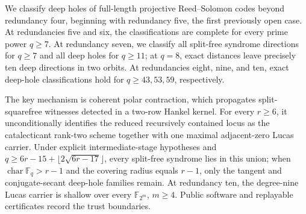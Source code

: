 We classify deep holes of full-length projective Reed--Solomon codes beyond
redundancy four, beginning with redundancy five, the first previously open
case. At redundancies five and six, the classifications are complete for every
prime power \(q\geq7\). At redundancy seven, we classify all split-free syndrome
directions for \(q\geq7\) and all deep holes for \(q\geq11\); at \(q=8\), exact
distances leave precisely ten deep directions in two orbits. At redundancies
eight, nine, and ten, exact deep-hole classifications hold for
\(q\geq43,53,59\), respectively.

The key mechanism is coherent polar contraction, which propagates
split-squarefree witnesses detected in a two-row Hankel kernel. For every
\(r\geq6\), it unconditionally identifies the reduced recursively contained
locus as the catalecticant rank-two scheme together with one maximal
adjacent-zero Lucas carrier. Under explicit intermediate-stage hypotheses and
\(q\geq6r-15+\lfloor2\sqrt{6r-17}\rfloor\), every split-free syndrome lies in
this union; when \(\operatorname{char}\mathbb F_q>r-1\) and the covering radius
equals \(r-1\), only the tangent and conjugate-secant deep-hole families remain.
At redundancy ten, the degree-nine Lucas carrier is shallow over every
\(\mathbb F_{2^m}\), \(m\geq4\). Public software and replayable certificates record
the trust boundaries.
